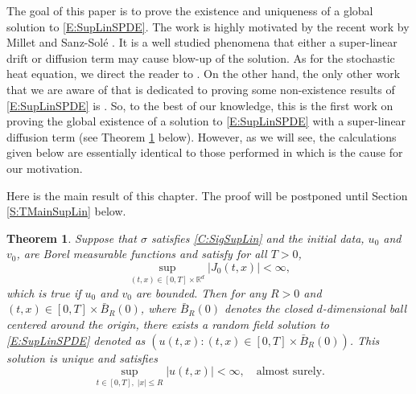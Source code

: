 \documentclass[12pt]{report}
\theoremstyle{plain}
\newtheorem{theorem}{Theorem}[section]
\theoremstyle{definition}
\numberwithin{equation}{section}
\newcommand{\R}{\mathbb{R}}
\begin{document}
The goal of this paper is to prove the existence and uniqueness of a global solution to \eqref{E:SupLinSPDE}. The work is highly motivated by the recent work by Millet and Sanz-Sol\'e \cite{millet.sanz-sole:21:global}. It is a well studied phenomena that either a super-linear drift or diffusion term may cause blow-up of the solution. As for the stochastic heat equation, we direct the reader to \cite{foondun.nualart:21:osgood, mueller.sowers:93:blowup, dalang.khoshnevisan.ea:19:global, bonder.groisman:09:global}. On the other hand, the only other work that we are aware of that is dedicated to proving some non-existence results of \eqref{E:SupLinSPDE} is \cite{asogwa.mijena.ea:20:blow-up}. So, to the best of our knowledge, this is the first work on proving the global existence of a solution to \eqref{E:SupLinSPDE} with a super-linear diffusion term (see Theorem \ref{T:MainSupLin} below). However, as we will see, the calculations given below are essentially identical to those performed in \cite{millet.sanz-sole:21:global} which is the cause for our motivation. \bigskip 

Here is the main result of this chapter. The proof will be postponed until Section \ref{S:TMainSupLin} below.

\begin{theorem} \label{T:MainSupLin}
	Suppose that $\sigma$ satisfies \eqref{C:SigSupLin} and the initial data, $u_0$ and $v_0$, are Borel measurable functions and satisfy for all $T>0$,
	\[
	\sup_{(t, x) \in [0,T] \times \R^d} |J_0(t,x)| < \infty,
	\]
	which is true if $u_0$ and $v_0$ are bounded. Then for any $R>0$ and $(t,x) \in [0,T] \times \bar{B}_R(0)$, where $\bar{B}_R(0)$ denotes the closed $d$-dimensional ball centered around the origin, there exists a random field solution to \eqref{E:SupLinSPDE} denoted as $(u(t,x): (t,x) \in [0,T] \times \bar{B}_R(0))$. This solution is unique and satisfies 
	\begin{equation}
	\sup_{t\in[0,T],\; |x| \le R} |u(t,x)| < \infty, \quad \text{almost surely.}
	\end{equation}
\end{theorem}
\end{document}
